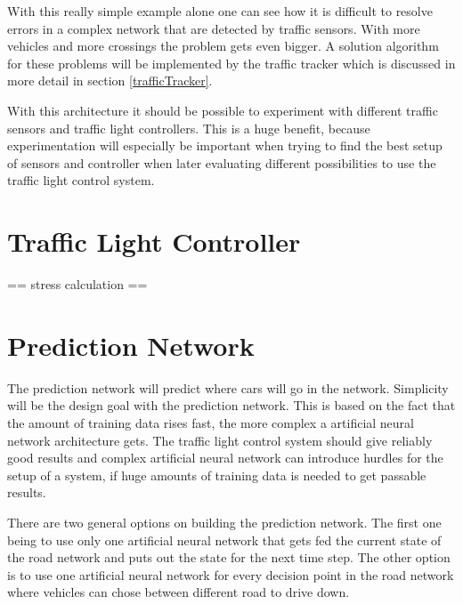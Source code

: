 With this really simple example alone one can see how it is difficult to resolve errors in a complex network that are detected by traffic sensors. With more vehicles and more crossings the problem gets even bigger. A solution algorithm for these problems will be implemented by the traffic tracker which is discussed in more detail in section \ref{trafficTracker}.

With this architecture it should be possible to experiment with different traffic sensors and traffic light controllers. This is a huge benefit, because experimentation will especially be important when trying to find the best setup of sensors and controller when later evaluating different possibilities to use the traffic light control system.

\section{Traffic Light Controller}
\label{trafficLightController}

== stress calculation ==

\section{Prediction Network}
\label{predictionNetwork}

The prediction network will predict where cars will go in the network. Simplicity will be the design goal with the prediction network. This is based on the fact that the amount of training data rises fast, the more complex a artificial neural network architecture gets. The traffic light control system should give reliably good results and complex artificial neural network can introduce hurdles for the setup of a system, if huge amounts of training data is needed to get passable results. 

There are two general options on building the prediction network. The first one being to use only one artificial neural network that gets fed the current state of the road network and puts out the state for the next time step. The other option is to use one artificial neural network for every decision point in the road network where vehicles can chose between different road to drive down.

